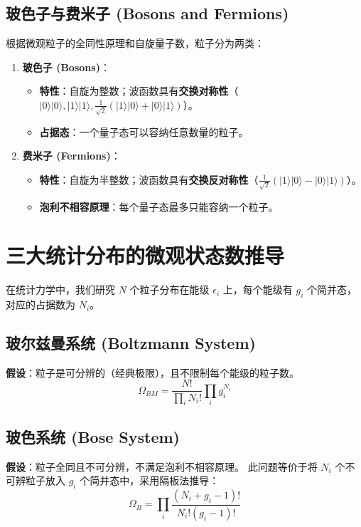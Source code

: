 \documentclass{article}
\begin{document}
\subsection{玻色子与费米子 (Bosons and Fermions)}
根据微观粒子的全同性原理和自旋量子数，粒子分为两类：
\begin{enumerate}
    \item \textbf{玻色子 (Bosons)}：
    \begin{itemize}
        \item \textbf{特性}：自旋为整数；波函数具有\textbf{交换对称性}（$|0\rangle|0\rangle, |1\rangle|1\rangle, \frac{1}{\sqrt{2}}(|1\rangle|0\rangle + |0\rangle|1\rangle)$）。
        \item \textbf{占据态}：一个量子态可以容纳任意数量的粒子。
    \end{itemize}
    \item \textbf{费米子 (Fermions)}：
    \begin{itemize}
        \item \textbf{特性}：自旋为半整数；波函数具有\textbf{交换反对称性}（$\frac{1}{\sqrt{2}}(|1\rangle|0\rangle - |0\rangle|1\rangle)$）。
        \item \textbf{泡利不相容原理}：每个量子态最多只能容纳一个粒子。
    \end{itemize}
\end{enumerate}

\section{三大统计分布的微观状态数推导}

在统计力学中，我们研究 $N$ 个粒子分布在能级 $\epsilon_i$ 上，每个能级有 $g_i$ 个简并态，对应的占据数为 $N_i$。

\subsection{玻尔兹曼系统 (Boltzmann System)}
\textbf{假设}：粒子是可分辨的（经典极限），且不限制每个能级的粒子数。
\[ \Omega_{BM} = \frac{N!}{\prod_i N_i!} \prod_i g_i^{N_i} \]

\subsection{玻色系统 (Bose System)}
\textbf{假设}：粒子全同且不可分辨，不满足泡利不相容原理。
此问题等价于将 $N_i$ 个不可辨粒子放入 $g_i$ 个简并态中，采用隔板法推导：
\[ \Omega_B = \prod_i \frac{(N_i + g_i - 1)!}{N_i! (g_i - 1)!} \]
\end{document}
